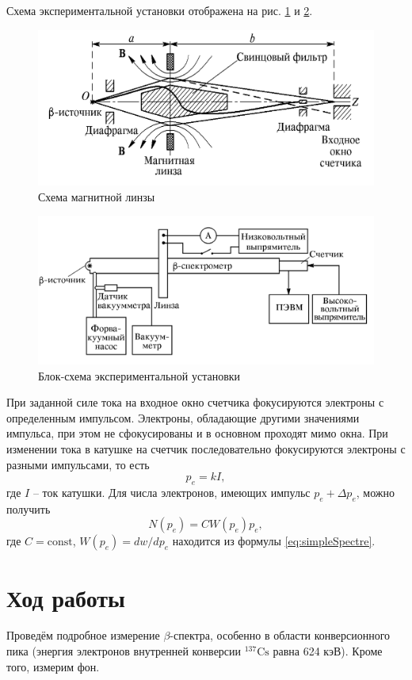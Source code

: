 \documentclass[a4paper, 12pt]{article}%
\newcommand{\const}{\mathrm{const}}
\newcommand{\isotope}[2]{$ ^{#2}\mathrm{#1} $}
\newcommand{\btt}{$\beta $}
\begin{document}
	Схема экспериментальной установки отображена на рис. \ref{fig:screenshot2} и \ref{fig:screenshot3}.
	\begin{figure}
		\centering
		\includegraphics[width=0.7\linewidth]{Screenshot_2}
		\caption{Схема магнитной линзы}
		\label{fig:screenshot2}
	\end{figure}
	\begin{figure}
		\centering
		\includegraphics[width=0.7\linewidth]{Screenshot_3}
		\caption{Блок-схема экспериментальной установки}
		\label{fig:screenshot3}
	\end{figure}
	При заданной силе тока на входное окно счетчика фокусируются электроны с определенным импульсом. Электроны, обладающие другими значениями импульса, при этом не сфокусированы и в основном проходят мимо окна. При изменении тока в катушке на счетчик последовательно фокусируются электроны с разными	импульсами, то есть
	\begin{equation*}\label{eq:impulse}
		p_e = k I,
	\end{equation*}
	где $ I $ -- ток катушки.
	Для числа электронов, имеющих импульс $ p_e+\Delta p_e $, можно получить
	\begin{equation*}\label{eq:n_ot_Pe}
		N(p_e) = C W(p_e) p_e,
	\end{equation*}
	где $ C = \const $, $ W(p_e) = d w / d p_e $ находится из формулы \eqref{eq:simpleSpectre}.
	
	\newpage
	\section{Ход работы}
	
	Проведём подробное измерение \btt-спектра, особенно в области конверсионного пика (энергия электронов внутренней конверсии	\isotope{Cs}{137} равна 624 кэВ).	Кроме того, измерим фон.
	
\end{document}
